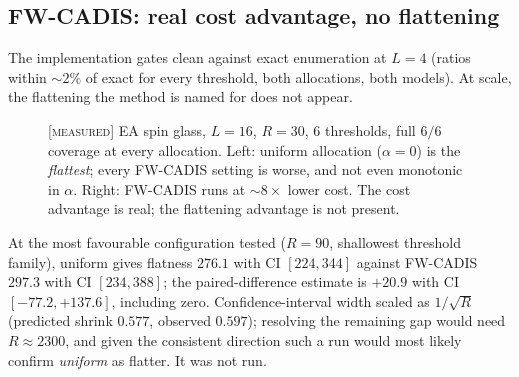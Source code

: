 \documentclass[11pt,a4paper]{article}
\newcommand{\MEAS}{\textcolor{blue!60!black}{\footnotesize[\textsc{measured}]}}
\begin{document}
\subsection{FW-CADIS: real cost advantage, no flattening}
The implementation gates clean against exact enumeration at $L=4$ (ratios within $\sim2\%$ of
exact for every threshold, both allocations, both models). At scale, the flattening the method is
named for does not appear.

\begin{figure}[H]\centering
{}\hfill
{}
\caption{\MEAS{} EA spin glass, $L=16$, $R=30$, 6 thresholds, full $6/6$ coverage at every
allocation. Left: uniform allocation ($\alpha=0$) is the \emph{flattest}; every FW-CADIS setting
is worse, and not even monotonic in $\alpha$. Right: FW-CADIS runs at $\sim8\times$ lower cost.
The cost advantage is real; the flattening advantage is not present.}
\label{fig:fwcadis}
\end{figure}

At the most favourable configuration tested ($R=90$, shallowest threshold family), uniform gives
flatness $276.1$ with CI $[224,344]$ against FW-CADIS $297.3$ with CI $[234,388]$; the
paired-difference estimate is $+20.9$ with CI $[-77.2,+137.6]$, including zero. Confidence-interval
width scaled as $1/\sqrt{R}$ (predicted shrink $0.577$, observed $0.597$); resolving the remaining
gap would need $R\approx2300$, and given the consistent direction such a run would most likely
confirm \emph{uniform} as flatter. It was not run.
\end{document}
